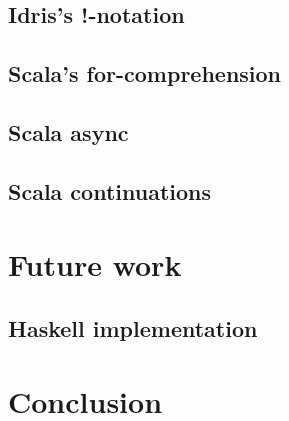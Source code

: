\subsection{Idris's !-notation}

\subsection{Scala's for-comprehension}

\subsection{Scala async}

\subsection{Scala continuations}

\section{Future work}

\subsection{Haskell implementation}\label{Haskell implementation}

\section{Conclusion}



  
  


